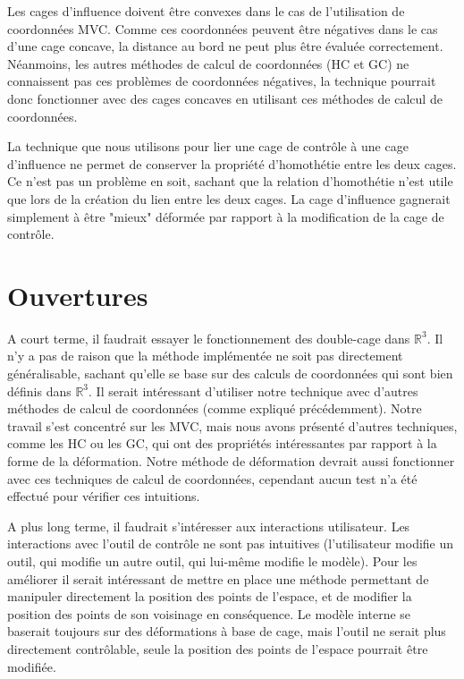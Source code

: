 Les cages d'influence doivent être convexes dans le cas de l'utilisation de
coordonnées MVC. Comme ces coordonnées peuvent être négatives dans le cas
d'une cage concave, la distance au bord ne peut plus être évaluée
correctement. Néanmoins, les autres méthodes de calcul de coordonnées (HC et
GC) ne connaissent pas ces problèmes de coordonnées négatives, la technique
pourrait donc fonctionner avec des cages concaves en utilisant ces méthodes de
calcul de coordonnées.

La technique que nous utilisons pour lier une cage de contrôle à une cage
d'influence ne permet de conserver la propriété d'homothétie entre les deux
cages. Ce n'est pas un problème en soit, sachant que la relation d'homothétie
n'est utile que lors de la création du lien entre les deux cages. La cage
d'influence gagnerait simplement à être "mieux" déformée par rapport à la
modification de la cage de contrôle.

\section{Ouvertures}

A court terme, il faudrait essayer le fonctionnement des double-cage dans
$\mathbb{R}^3$. Il n'y a pas de raison que la méthode implémentée ne soit pas
directement généralisable, sachant qu'elle se base sur des calculs de
coordonnées qui sont bien définis dans $\mathbb{R}^3$. Il serait intéressant
d'utiliser notre technique avec d'autres méthodes de calcul de coordonnées
(comme expliqué précédemment). Notre travail s'est concentré sur les MVC, mais
nous avons présenté d'autres techniques, comme les HC ou les GC, qui ont des
propriétés intéressantes par rapport à la forme de la déformation. Notre
méthode de déformation devrait aussi fonctionner avec ces techniques de calcul
de coordonnées, cependant aucun test n'a été effectué pour vérifier ces
intuitions.

A plus long terme, il faudrait s'intéresser aux interactions utilisateur. Les
interactions avec l'outil de contrôle ne sont pas intuitives (l'utilisateur
modifie un outil, qui modifie un autre outil, qui lui-même modifie le modèle).
Pour les améliorer il serait intéressant de mettre en place une méthode
permettant de manipuler directement la position des points de l'espace, et de
modifier la position des points de son voisinage en conséquence. Le modèle
interne se baserait toujours sur des déformations à base de cage, mais l'outil
ne serait plus directement contrôlable, seule la position des points de
l'espace pourrait être modifiée.
